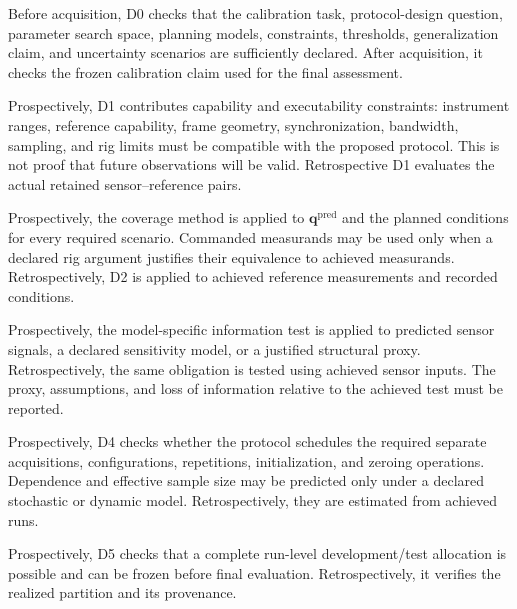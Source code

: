 \documentclass[11pt,a4paper]{article}
\begin{document}
\begin{description}[style=nextline]
    \item[D0---Claim completeness.]
    Before acquisition, D0 checks that the calibration task, protocol-design
    question, parameter search space, planning models, constraints, thresholds,
    generalization claim, and uncertainty scenarios are sufficiently declared.
    After acquisition, it checks the frozen calibration claim used for the
    final assessment.

    \item[D1---Measurement and execution validity.]
    Prospectively, D1 contributes capability and executability constraints:
    instrument ranges, reference capability, frame geometry, synchronization,
    bandwidth, sampling, and rig limits must be compatible with the proposed
    protocol. This is not proof that future observations will be valid.
    Retrospective D1 evaluates the actual retained sensor--reference pairs.

    \item[D2---Claimed-domain coverage.]
    Prospectively, the coverage method is applied to
    $\mathbf{q}^{\mathrm{pred}}$ and the planned conditions for every required
    scenario. Commanded measurands may be used only when a declared rig
    argument justifies their equivalence to achieved measurands.
    Retrospectively, D2 is applied to achieved reference measurements and
    recorded conditions.

    \item[D3---Informativeness and identifiability.]
    Prospectively, the model-specific information test is applied to predicted
    sensor signals, a declared sensitivity model, or a justified structural
    proxy. Retrospectively, the same obligation is tested using achieved sensor
    inputs. The proxy, assumptions, and loss of information relative to the
    achieved test must be reported.

    \item[D4---Independent replication and dependence.]
    Prospectively, D4 checks whether the protocol schedules the required
    separate acquisitions, configurations, repetitions, initialization, and
    zeroing operations. Dependence and effective sample size may be predicted
    only under a declared stochastic or dynamic model. Retrospectively, they
    are estimated from achieved runs.

    \item[D5---Leakage-resistant validation.]
    Prospectively, D5 checks that a complete run-level development/test
    allocation is possible and can be frozen before final evaluation.
    Retrospectively, it verifies the realized partition and its provenance.


\end{description}
\end{document}
